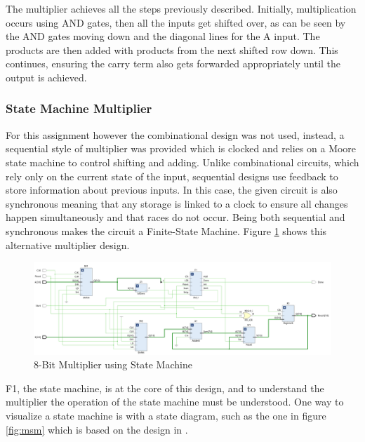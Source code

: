 \documentclass[11pt]{article}
\begin{document}
The multiplier achieves all the steps previously described.
Initially, multiplication occurs using AND gates, then all the inputs get shifted over, as can be seen by the AND gates moving down and the diagonal lines for the A input.
The products are then added with products from the next shifted row down.
This continues, ensuring the carry term also gets forwarded appropriately until the output is achieved.

\subsubsection{State Machine Multiplier}

For this assignment however the combinational design was not used, 
instead, a sequential style of multiplier was provided which is clocked and relies on a Moore state machine to control shifting and adding.
Unlike combinational circuits, which rely only on the current state of the input, sequential designs use feedback to store information about previous inputs\cite{dally}.
In this case, the given circuit is also synchronous meaning that any storage is linked to a clock to ensure all changes happen simultaneously and that races do not occur.
Being both sequential and synchronous makes the circuit a Finite-State Machine\cite{dally}.
Figure \ref{fig:4bit_mult} shows this alternative multiplier design. 

\begin{figure}[H]        
    \centering
    \includegraphics[width=\textwidth]{8bit.png}
    \caption{8-Bit Multiplier using State Machine}
    \label{fig:4bit_mult}
\end{figure} 

F1, the state machine, is at the core of this design, and to understand the multiplier the operation of the state machine must be understood.
One way to visualize a state machine is with a state diagram, such as the one in figure \ref{fig:msm} which is based on the design in \cite{smith1997application}.
\end{document}
